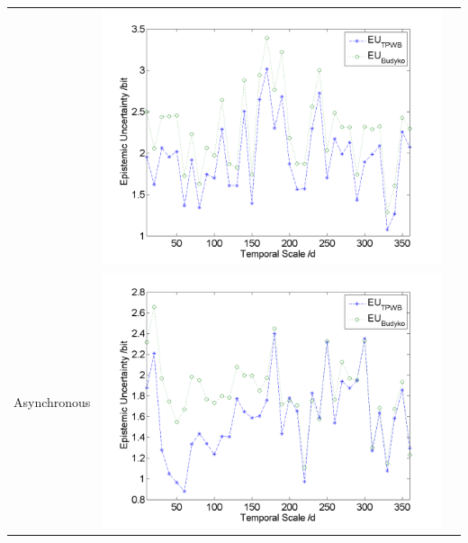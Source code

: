 \documentclass[review]{elsarticle}
\begin{document}
\begin{table}[H]
{\begin{tabular}{ccc}
&\begin{minipage}{.6\textwidth}\includegraphics[width=\linewidth]{resultgraph/06810000EU.png}\end{minipage}
\\
Asynchronous
&\begin{minipage}{.6\textwidth}\includegraphics[width=\linewidth]{resultgraph/02143000EU.png}\end{minipage}
 

\end{tabular}}
\end{table}
\end{document}

